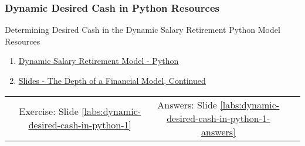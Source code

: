 \documentclass[handout, 11pt]{beamer}
\begin{document}
\begin{frame}
\frametitle{Dynamic Desired Cash in Python Resources}
{
\begin{block}{Determining Desired Cash in the Dynamic Salary Retirement Python Model Resources}
\begin{enumerate}
\item \textcolor{blue}{\underline{\href{https://nickderobertis.github.io/fin-model-course/\_static/Examples/Introduction/Python/Dynamic Salary Retirement Model.ipynb}{Dynamic Salary Retirement Model - Python}}}
\item \textcolor{blue}{\underline{\href{https://nickderobertis.github.io/fin-model-course/\_static/generated/pdfs/S5 The Depth of a Financial Model, Continued.pdf}{Slides - The Depth of a Financial Model, Continued}}}
\end{enumerate}
\vfill
\begin{tabular*}{\textwidth}{@{\extracolsep{\fill}}cccc}
\toprule
\hfill & Exercise: Slide \textcolor{blue}{\underline{\ref{labs:dynamic-desired-cash-in-python-1}}} & Answers: Slide \textcolor{blue}{\underline{\ref{labs:dynamic-desired-cash-in-python-1-answers}}} & \hfill\\

\end{tabular*}
\end{block}
}
\label{labs:dynamic-desired-cash-in-python-1-resources}
\end{frame}
\setcounter{framenumber}{\value{finalframe}}
\end{document}
